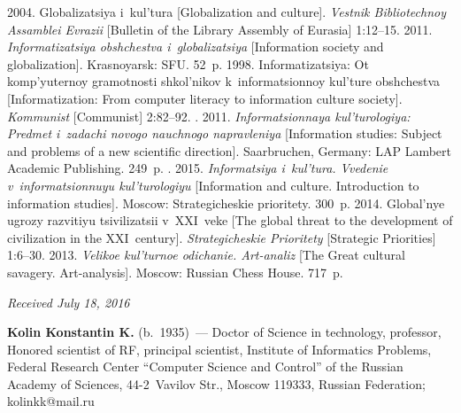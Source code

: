 \begin{multicols}{2}
{{\begin{thebibliography}{99}
       2004. Globalizatsiya i~kul'tura [Globalization and culture]. 
\textit{Vestnik Bibliotechnoy Assamblei Evrazii}  
[Bulletin of the Library Assembly of Eurasia] 
1:12--15.
       2011. \textit{Informatizatsiya obshchestva i~glo\-ba\-li\-za\-tsiya}
      [Information society and globalization]. Krasnoyarsk: SFU. 52~p.
       1998. Informatizatsiya: Ot komp'yuternoy gramotnosti shkol'nikov 
k~informatsionnoy kul'ture obshchestva [Informatization: From computer literacy to information 
culture society]. \textit{Kommunist} [Communist] 2:82--92.
      . 2011. \textit{Informatsionnaya kul'turologiya: 
Predmet i~zadachi novogo nauchnogo napravleniya} [Information studies: Subject and problems 
of a new scientific direction]. Saarbruchen, Germany: LAP Lambert Academic Publishing. 
249~p.
      . 2015. \textit{Informatsiya i~kul'tura. Vvedenie 
v~informatsionnuyu kul'turologiyu} [Information and culture. Introduction to information 
studies]. Moscow: Strategicheskie prioritety. 300~p.
       2014. Global'nye ugrozy razvitiyu tsivilizatsii v~XXI~veke [The 
global threat to the development of civilization in the XXI~century]. \textit{Strategicheskie 
Prioritety}  [Strategic Priorities] 1:6--30.
       2013. \textit{Velikoe kul'turnoe odichanie. Art-analiz} [The 
Great cultural savagery. Art-analysis]. Moscow: Russian Chess House. 717~p.
   \end{thebibliography}

 }
 }

\end{multicols}

\vspace*{-3pt}

\hfill{\small\textit{Received July 18, 2016}}

\Contrl

\noindent
\textbf{Kolin Konstantin K.} (b.\ 1935)~--- Doctor of Science in technology, professor, Honored scientist 
of RF, principal scientist, Institute of Informatics Problems, Federal Research Center ``Computer Science 
and Control'' of the Russian Academy of Sciences, 44-2~Vavilov Str., Moscow 119333, Russian 
Federation; \mbox{kolinkk@mail.ru}
\label{end\stat}


\renewcommand{\bibname}{\protect\rm Литература}